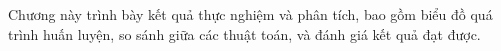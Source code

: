 Chương này trình bày kết quả thực nghiệm và phân tích, bao gồm biểu đồ quá trình
huấn luyện, so sánh giữa các thuật toán, và đánh giá kết quả đạt được.

